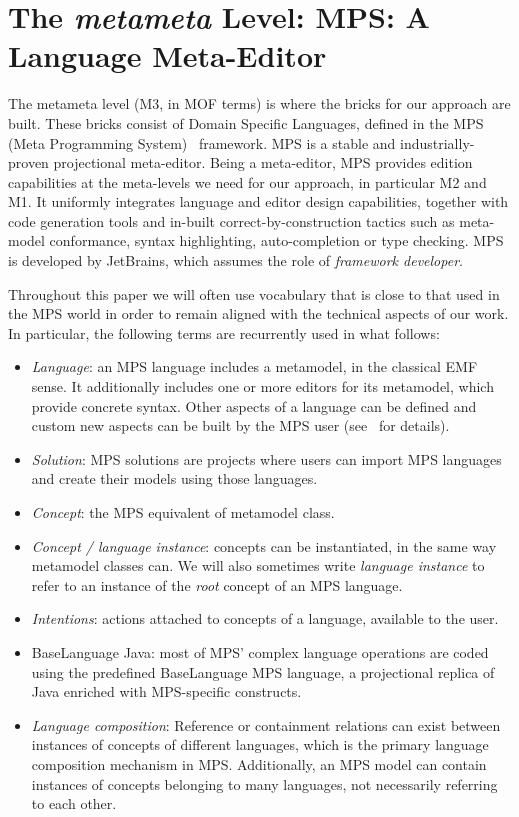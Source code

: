 \section{The \emph{metameta} Level: MPS: A Language Meta-Editor}
\label{sec:metameta}

The metameta level (M3, in MOF terms) is where the bricks for our approach are
built. These bricks consist of Domain Specific Languages, defined in the MPS
(Meta Programming System)~\cite{mps} framework. MPS is a stable and
industrially-proven projectional meta-editor. Being a meta-editor, MPS provides edition
capabilities at the meta-levels we need for our approach, in particular M2 and
M1. It uniformly integrates language and editor design capabilities, together
with code generation tools and in-built correct-by-construction tactics such as meta-model
conformance, syntax highlighting, auto-completion or type checking.  
MPS is developed by JetBrains, which assumes the role of \emph{framework
developer}. 

Throughout this paper we will often use vocabulary that is close to that used in
the MPS world in order to remain aligned with the technical aspects of our
work. In particular, the following terms are recurrently used in what follows:

\begin{itemize}
  \item \emph{Language}: an MPS language includes a metamodel, in the classical
  EMF sense. It additionally includes one or more editors for its metamodel,
  which provide concrete syntax. Other aspects of a language
  can be defined and custom new aspects can be
  built by the MPS user (see~\cite{mps} for details).
  \item \emph{Solution}: MPS solutions are projects where users can import
  MPS languages and create their models using those languages.
  \item \emph{Concept}: the MPS equivalent of metamodel class.
  \item \emph{Concept / language instance}: concepts can be instantiated, in
  the same way metamodel classes can. We will also sometimes write
  \emph{language instance} to refer to an instance of the \emph{root} concept of
  an MPS language.
  \item \emph{Intentions}: actions attached to
  concepts of a language, available to the user. 
  \item \textsf{BaseLanguage Java}: most of MPS' complex language operations are
  coded using the predefined \textsf{BaseLanguage} MPS language, a projectional
  replica of Java enriched with MPS-specific constructs.
  \item \emph{Language composition}:  Reference or containment relations can exist between instances of
  concepts of different languages, which is the primary language composition
  mechanism in MPS.
  Additionally, an MPS model can contain instances of concepts
 belonging to many languages, not necessarily referring to each other.
\end{itemize}

